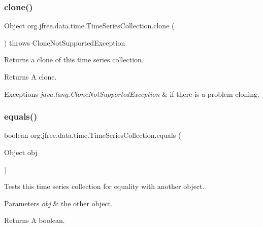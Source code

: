 \subsubsection{\texorpdfstring{clone()}{clone()}}
{\footnotesize\ttfamily Object org.\+jfree.\+data.\+time.\+Time\+Series\+Collection.\+clone (\begin{DoxyParamCaption}{ }\end{DoxyParamCaption}) throws Clone\+Not\+Supported\+Exception}

Returns a clone of this time series collection.

\begin{DoxyReturn}{Returns}
A clone.
\end{DoxyReturn}

\begin{DoxyExceptions}{Exceptions}
{\em java.\+lang.\+Clone\+Not\+Supported\+Exception} & if there is a problem cloning. \\
\hline
\end{DoxyExceptions}
\mbox{\label{classorg_1_1jfree_1_1data_1_1time_1_1_time_series_collection_a0a0c4bb544b6298019e8b65061c3a65a}} 
\subsubsection{\texorpdfstring{equals()}{equals()}}
{\footnotesize\ttfamily boolean org.\+jfree.\+data.\+time.\+Time\+Series\+Collection.\+equals (\begin{DoxyParamCaption}\item[{Object}]{obj }\end{DoxyParamCaption})}

Tests this time series collection for equality with another object.


\begin{DoxyParams}{Parameters}
{\em obj} & the other object.\\
\hline
\end{DoxyParams}
\begin{DoxyReturn}{Returns}
A boolean. 
\end{DoxyReturn}
\mbox{\label{classorg_1_1jfree_1_1data_1_1time_1_1_time_series_collection_a3d78b109c0a1f7a9795f8c5108613084}} 
